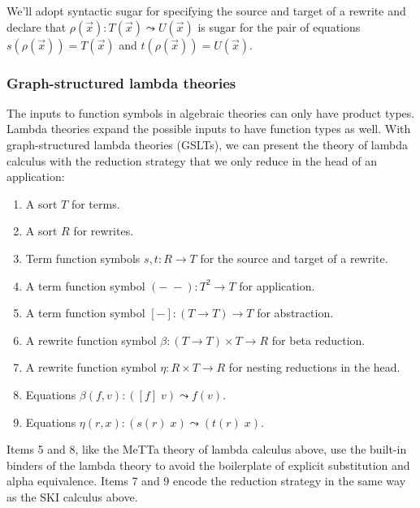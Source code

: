 \documentclass{article}
\begin{document}
We'll adopt syntactic sugar for specifying the source and target of a rewrite and declare that $\rho(\vec{x})\colon T(\vec{x}) \leadsto U(\vec{x})$ is sugar for the pair of equations $s(\rho(\vec{x})) = T(\vec{x})$ and $t(\rho(\vec{x})) = U(\vec{x}).$

\subsubsection{Graph-structured lambda theories}

The inputs to function symbols in algebraic theories can only have product types.  Lambda theories expand the possible inputs to have function types as well.  With graph-structured lambda theories (GSLTs), we can present the theory of lambda calculus with the reduction strategy that we only reduce in the head of an application:
\begin{enumerate}
    \item A sort $T$ for terms.
    \item A sort $R$ for rewrites.
    \item Term function symbols $s, t\colon R \to T$ for the source and target of a rewrite.
    \item A term function symbol $(-\; -)\colon T^2 \to T$ for application.
    \item A term function symbol $[-]\colon (T \to T) \to T$ for abstraction.
    \item A rewrite function symbol $\beta\colon (T \to T) \times T \to R$ for beta reduction.
    \item A rewrite function symbol $\eta\colon R \times T \to R$ for nesting reductions in the head.
    \item Equations $\beta(f, v)\colon ([f]\; v) \leadsto f(v).$
    \item Equations $\eta(r, x)\colon (s(r)\; x) \leadsto (t(r)\; x).$
\end{enumerate}
Items 5 and 8, like the MeTTa theory of lambda calculus above, use the built-in binders of the lambda theory to avoid the boilerplate of explicit substitution and alpha equivalence.  Items 7 and 9 encode the reduction strategy in the same way as the SKI calculus above.
\end{document}
